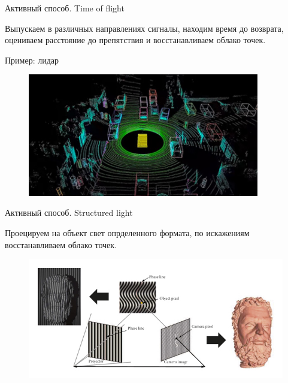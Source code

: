 \documentclass[6pt,pdf,utf8,russian]{beamer}
\begin{document}
\begin{frame}[fragile]{Активный способ. Time of flight}
    \begin{block}{}
        Выпускаем в различных направлениях сигналы, находим время до возврата, оцениваем расстояние
        до препятствия и восстанавливаем облако точек.

        Пример: лидар
    \end{block}

    \pause

    \begin{figure}
        \includegraphics[width=0.9\textwidth]{images/time_of_flight.jpg}
    \end{figure}

\end{frame}

\begin{frame}[fragile]{Активный способ. Structured light}
    \begin{block}{}
        Проецируем на объект свет опрделенного формата, по искажениям восстанавливаем
        облако точек.
    \end{block}

    \pause

    \begin{figure}
        \includegraphics[width=\textwidth]{images/structured_light.jpg}
    \end{figure}

\end{frame}
\end{document}
